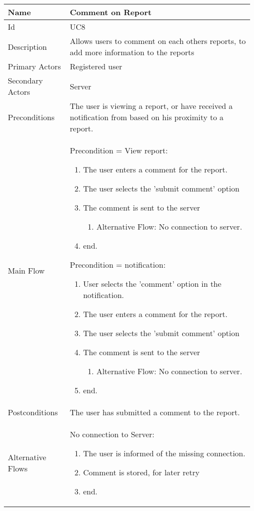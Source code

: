 \begin{tabularx}{\textwidth}{|l|X|}
\hline
Name              & Comment on Report \\ \hline 
Id                & UC8 \\ \hline
Description       & Allows users to comment on each others reports, to add more information to the reports \\ \hline
Primary Actors    & Registered user \\ \hline
Secondary Actors  & Server \\ \hline
Preconditions     & The user is viewing a report, or have received a notification from based on his proximity to a report. \\ \hline
Main Flow         &
Precondition = View report:
{\footnotesize \begin{enumerate}
\item The user enters a comment for the report.
\item The user selects the 'submit comment' option
\item The comment is sent to the server
 \begin{enumerate}
\item Alternative Flow: No connection to server.
\end{enumerate}
\item end.
\end{enumerate}}
Precondition = notification:
{\footnotesize \begin{enumerate}
\item User selects the 'comment' option in the notification.
\item The user enters a comment for the report.
\item The user selects the 'submit comment' option
\item The comment is sent to the server
 \begin{enumerate}
\item Alternative Flow: No connection to server.
\end{enumerate}
\item end.
\end{enumerate}} 
\\ \hline
Postconditions    & The user has submitted a comment to the report. \\ \hline
Alternative Flows & 
No connection to Server:
{\footnotesize \begin{enumerate}
\item The user is informed of the missing connection.
\item Comment is stored, for later retry
\item end.
\end{enumerate}}
\\ \hline
\end{tabularx}

